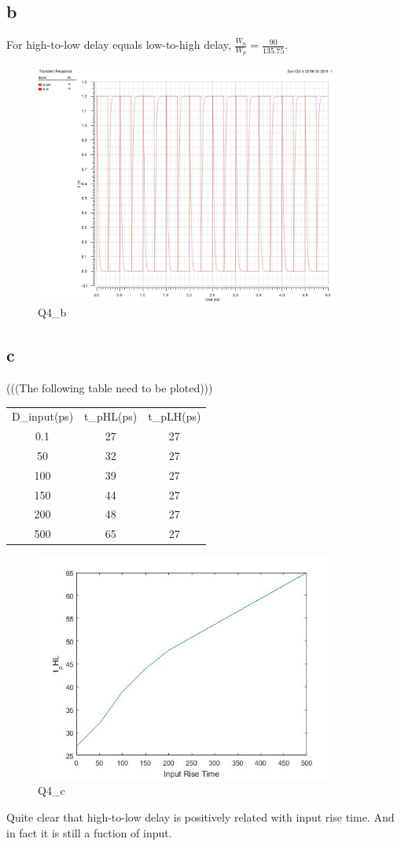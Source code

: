 \documentclass[a4paper,10pt]{article}
\begin{document}
\subsection*{b}
For high-to-low delay equals low-to-high delay, \begin{math}\frac{W_n}{W_p} = \frac{90}{135.75}\end{math}.\\
\begin{figure}
 \centering
 \includegraphics[width=10cm]{Q4_b.jpg}
 \caption{Q4\_b}
\end{figure}

\subsection*{c}
(((The following table need to be ploted)))\\
\begin{tabular}{c c c}
 D\_input(ps)	&	t\_pHL(ps)	&	t\_pLH(ps)\\
 0.1		&	27		&	27\\
 50		&	32		&	27\\
 100		&	39		&	27\\
 150		&	44		&	27\\
 200		&	48		&	27\\
 500		&	65		&	27\\
\end{tabular}
\begin{figure}
 \centering
 \includegraphics[width=10cm]{Q4_c.jpg}
 \caption{Q4\_c}
\end{figure}
Quite clear that high-to-low delay is positively related with input rise time. And in fact it is still a fuction of input.
\end{document}
